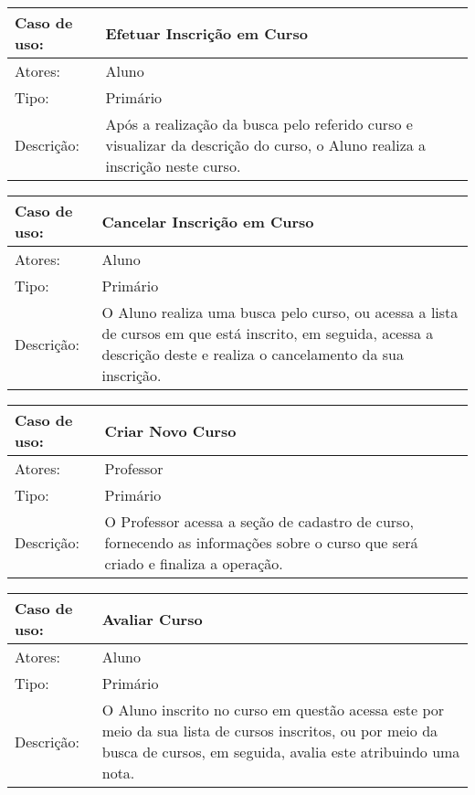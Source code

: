 \documentclass[12pt,a4paper,onecolumn,titlepage]{article}
\begin{document}
\begin{table}[h!]
\begin{center}
\begin{tabular}{p{2.5cm} p{9.5cm}}
Caso de uso: & \textbf{Efetuar Inscrição em Curso} \\ \hline
Atores: & Aluno \\ \hline
Tipo: & Primário \\ \hline
Descrição: & Após a realização da busca pelo referido curso e visualizar da descrição do curso, o Aluno realiza a inscrição neste curso.

\end{tabular}
\end{center}
\end{table}


\begin{table}[h!]
\begin{center}
\begin{tabular}{p{2.5cm} p{9.5cm}}
Caso de uso: & \textbf{Cancelar Inscrição em Curso} \\ \hline
Atores: & Aluno \\ \hline
Tipo: & Primário \\ \hline
Descrição: & O Aluno realiza uma busca pelo curso, ou acessa a lista de cursos em que está inscrito, em seguida, acessa a descrição deste e realiza o cancelamento da sua inscrição.

\end{tabular}
\end{center}
\end{table}


\begin{table}[h!]
\begin{center}
\begin{tabular}{p{2.5cm} p{9.5cm}}
Caso de uso: & \textbf{Criar Novo Curso} \\ \hline
Atores: & Professor \\ \hline
Tipo: & Primário \\ \hline
Descrição: & O Professor acessa a seção de cadastro de curso, fornecendo as informações sobre o curso que será criado e finaliza a operação.

\end{tabular}
\end{center}
\end{table}


\begin{table}[h!]
\begin{center}
\begin{tabular}{p{2.5cm} p{9.5cm}}
Caso de uso: & \textbf{Avaliar Curso} \\ \hline
Atores: & Aluno \\ \hline
Tipo: & Primário \\ \hline
Descrição: & O Aluno inscrito no curso em questão acessa este por meio da sua lista de cursos inscritos, ou por meio da busca de cursos, em seguida, avalia este atribuindo uma nota.

\end{tabular}
\end{center}
\end{table}
\end{document}
